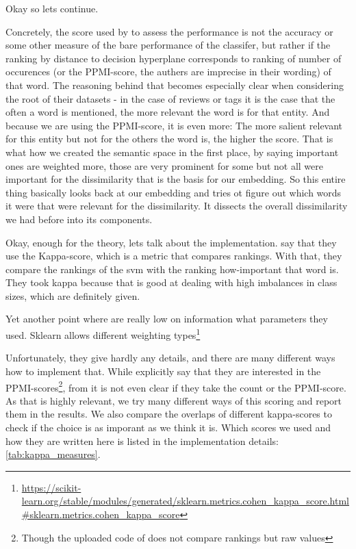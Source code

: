 Okay so lets continue.

Concretely, the score used by \cite{Derrac2015} to assess the performance is not the accuracy or some other measure of the bare performance of the classifer, but rather if the ranking by distance to decision hyperplane corresponds to ranking of number of occurences (or the PPMI-score, the authers are imprecise in their wording) of that word.
The reasoning behind that becomes especially clear when considering the root of their datasets - in the case of reviews or tags it is the case that the often a word is mentioned, the more relevant the word is for that entity. And because we are using the PPMI-score, it is even more: The more salient relevant for this entity but not for the others the word is, the higher the score. That is what how we created the semantic space in the first place, by saying important ones are weighted more, those are very prominent for some but not all were important for the dissimilarity that is the basis for our embedding. So this entire thing basically looks back at our embedding and tries ot figure out which words it were that were relevant for the dissimilarity. It dissects the overall dissimilarity we had before into its components.

Okay, enough for the theory, lets talk about the implementation. \cite{Derrac2015} say that they use the Kappa-score, which is a metric that compares rankings. With that, they compare the rankings of the svm with the ranking how-important that word is. They took kappa because that is good at dealing with high imbalances in class sizes, which are definitely given.

Yet another point where \cite{Derrac2015} are really low on information what parameters they used. Sklearn allows different weighting types\footnote{\url{https://scikit-learn.org/stable/modules/generated/sklearn.metrics.cohen_kappa_score.html\#sklearn.metrics.cohen_kappa_score}} 

Unfortunately, they give hardly any details, and there are many different ways how to implement that. While \cite{Ager2018,Alshaikh2020} explicitly say that they are interested in the PPMI-scores\footnote{Though the uploaded code of \cite{Alshaikh2020} does not compare rankings but raw values}, from \cite{Derrac2015} it is not even clear if they take the count or the PPMI-score. As that is highly relevant, we try many different ways of this scoring and report them in the results. We also compare the overlaps of different kappa-scores to check if the choice is as imporant as we think it is. Which scores we used and how they are written here is listed in the implementation details: \autoref{tab:kappa_measures}.

